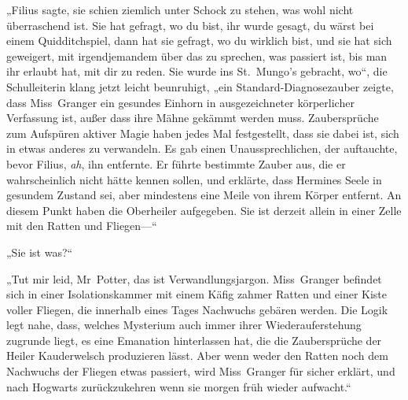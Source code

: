 „Filius sagte, sie schien ziemlich unter Schock zu stehen, was wohl nicht überraschend ist. Sie hat gefragt, wo du bist, ihr wurde gesagt, du wärst bei einem Quidditchspiel, dann hat sie gefragt, wo du wirklich bist, und sie hat sich geweigert, mit irgendjemandem über das zu sprechen, was passiert ist, bis man ihr erlaubt hat, mit dir zu reden. Sie wurde ins St.~Mungo’s gebracht, wo“, die Schulleiterin klang jetzt leicht beunruhigt, „ein Standard-Diagnosezauber zeigte, dass Miss~Granger ein gesundes Einhorn in ausgezeichneter körperlicher Verfassung ist, außer dass ihre Mähne gekämmt werden muss. Zaubersprüche zum Aufspüren aktiver Magie haben jedes Mal festgestellt, dass sie dabei ist, sich in etwas anderes zu verwandeln.
Es gab einen Unaussprechlichen, der auftauchte, bevor Filius, \emph{ah}, ihn entfernte. Er führte bestimmte Zauber aus, die er wahrscheinlich nicht hätte kennen sollen, und erklärte, dass Hermines Seele in gesundem Zustand sei, aber mindestens eine Meile von ihrem Körper entfernt. An diesem Punkt haben die Oberheiler aufgegeben. Sie ist derzeit allein in einer Zelle mit den Ratten und Fliegen—“

„Sie ist was?“

„Tut mir leid, Mr~Potter, das ist Verwandlungsjargon. Miss~Granger befindet sich in einer Isolationskammer mit einem Käfig zahmer Ratten und einer Kiste voller Fliegen, die innerhalb eines Tages Nachwuchs gebären werden. Die Logik legt nahe, dass, welches Mysterium auch immer ihrer Wiederauferstehung zugrunde liegt, es eine Emanation hinterlassen hat, die die Zaubersprüche der Heiler Kauderwelsch produzieren lässt. Aber wenn weder den Ratten noch dem Nachwuchs der Fliegen etwas passiert, wird Miss~Granger für sicher erklärt, und nach Hogwarts zurückzukehren wenn sie morgen früh wieder aufwacht.“

